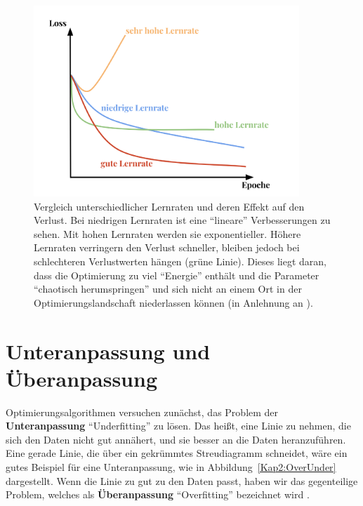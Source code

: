         \begin{figure}[H]
            \centering
            \includegraphics[width=10cm]{kapitel2/learnrate.png}
            \caption[Einfluss der Lernrate auf den Verlust]{Vergleich unterschiedlicher Lernraten und deren Effekt auf den Verlust. Bei niedrigen Lernraten ist eine \enquote{lineare} Verbesserungen zu sehen. Mit hohen Lernraten werden sie exponentieller. Höhere Lernraten verringern den Verlust schneller, bleiben jedoch bei schlechteren Verlustwerten hängen (grüne Linie). Dieses liegt daran, dass die Optimierung zu viel \enquote{Energie} enthält und die Parameter \enquote{chaotisch herumspringen} und sich nicht an einem Ort in der Optimierungslandschaft niederlassen können (in Anlehnung an \cite*{StanfordUniversityCoursecs231n2018}). }
            \label{Kap2:Lern}
        \end{figure}

        \section{Unteranpassung und Überanpassung}
        Optimierungsalgorithmen versuchen zunächst, das Problem der \textbf{Unteranpassung} \enquote{Underfitting} zu lösen. Das heißt, eine Linie zu nehmen, die sich den Daten nicht gut annähert, und sie besser an die Daten heranzuführen. Eine gerade Linie, die über ein gekrümmtes Streudiagramm schneidet, wäre ein gutes Beispiel für eine Unteranpassung, wie in Abbildung~\ref{Kap2:OverUnder} dargestellt. Wenn die Linie zu gut zu den Daten passt, haben wir das gegenteilige Problem, welches als \textbf{Überanpassung} \enquote{Overfitting} bezeichnet wird \cite*[27]{Patterson2019}.

